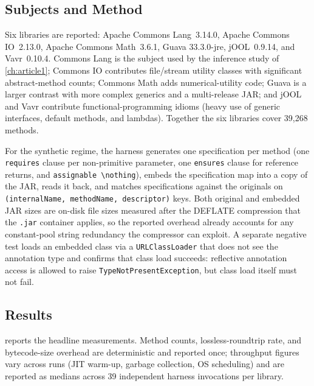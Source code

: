 \subsection{Subjects and Method}

Six libraries are reported: Apache Commons Lang~3.14.0, Apache Commons
IO~2.13.0, Apache Commons Math~3.6.1, Guava 33.3.0-jre, jOOL~0.9.14, and
Vavr~0.10.4. Commons Lang is the subject used by the inference study of
\cref{ch:article1}; Commons IO contributes file/stream utility classes with
significant abstract-method counts; Commons Math adds numerical-utility code;
Guava is a larger contrast with more complex generics and a multi-release JAR;
and jOOL and Vavr contribute functional-programming idioms (heavy use of generic
interfaces, default methods, and lambdas). Together the six libraries cover
39{,}268 methods.

For the synthetic regime, the harness generates one specification per method
(one \texttt{requires} clause per non-primitive parameter, one \texttt{ensures}
clause for reference returns, and \texttt{assignable \textbackslash nothing}),
embeds the specification map into a copy of the JAR, reads it back, and matches
specifications against the originals on \texttt{(internalName, methodName,
descriptor)} keys. Both original and embedded JAR sizes are on-disk file sizes
measured after the DEFLATE compression that the \texttt{.jar} container applies,
so the reported overhead already accounts for any constant-pool string
redundancy the compressor can exploit. A separate negative test loads an
embedded class via a \texttt{URLClassLoader} that does not see the annotation
type and confirms that class load succeeds: reflective annotation access is
allowed to raise \texttt{TypeNotPresentException}, but class load itself must not
fail.

\subsection{Results}

 reports the headline measurements. Method counts,
lossless-roundtrip rate, and bytecode-size overhead are deterministic and
reported once; throughput figures vary across runs (JIT warm-up, garbage
collection, OS scheduling) and are reported as medians across 39 independent
harness invocations per library.

